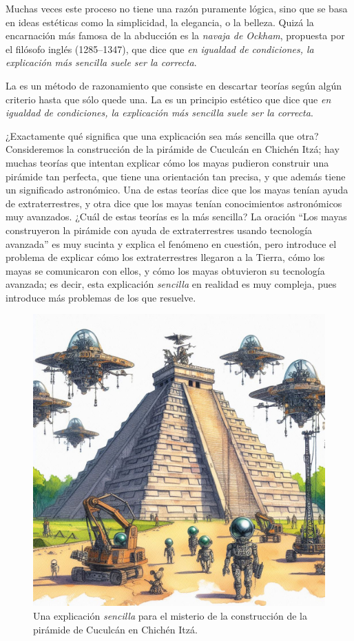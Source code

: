 Muchas veces este proceso no tiene una razón puramente lógica, sino que se basa
en ideas estéticas como la simplicidad, la elegancia, o la belleza.
Quizá la encarnación más famosa de la abducción es la \emph{navaja de Ockham},
propuesta por el filósofo inglés  (1285--1347), que dice que \emph{en igualdad de condiciones, la
    explicación más sencilla suele ser la correcta}.


\begin{remember}
    \label{rem:abduccion}
    La  es un método de razonamiento que consiste en
    descartar teorías según algún criterio hasta que sólo quede una.
    La  es un principio estético que dice que
    \emph{en igualdad de condiciones, la explicación más sencilla suele ser la
        correcta}.
\end{remember}

¿Exactamente qué significa que una explicación sea más sencilla que otra?
Consideremos la construcción de la pirámide de Cuculcán en Chichén Itzá; hay
muchas teorías que intentan explicar cómo los mayas pudieron construir una
pirámide tan perfecta, que tiene una orientación tan precisa, y que además
tiene un significado astronómico.
Una de estas teorías dice que los mayas tenían ayuda de extraterrestres, y otra
dice que los mayas tenían conocimientos astronómicos muy avanzados.
¿Cuál de estas teorías es la más sencilla?
La oración “Los mayas construyeron la pirámide con ayuda de extraterrestres
usando tecnología avanzada” es muy sucinta y explica el fenómeno en cuestión,
pero introduce el problema de explicar cómo los extraterrestres llegaron a la
Tierra, cómo los mayas se comunicaron con ellos, y cómo los mayas obtuvieron
su tecnología avanzada; es decir, esta explicación \emph{sencilla} en realidad
es muy compleja, pues introduce más problemas de los que resuelve.

\begin{figure}[ht]
    \centering
    \includegraphics[width=0.8\linewidth]{img/chichenitza}
    \caption{Una explicación \emph{sencilla} para el misterio de la construcción
        de la pirámide de Cuculcán en Chichén Itzá.}
\end{figure}

